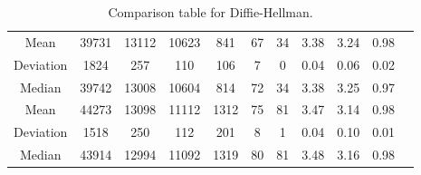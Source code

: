 \begin{table}[!ht]
{{\begin{tabular}{c|ccc|ccc|ccc|l}
                \multicolumn{1}{c|}{Mean}      & 39731                                               & 13112                                   & 10623                                  & 841     & 67       & 34       & 3.38    & 3.24     & 0.98     & \multicolumn{1}{c}{}                                                                           \\ \cline{1-10}
                \multicolumn{1}{c|}{Deviation} & 1824                                                & 257                                     & 110                                    & 106     & 7        & 0        & 0.04    & 0.06     & 0.02     & \multicolumn{1}{c}{}                                                                           \\ \cline{1-10}
                \multicolumn{1}{c|}{Median}    & 39742                                               & 13008                                   & 10604                                  & 814     & 72       & 34       & 3.38    & 3.25     & 0.97     & \multicolumn{1}{c}{\parbox[t]{1em}{}}  \\ \hline

                \multicolumn{1}{c|}{Mean}      & 44273                                               & 13098                                   & 11112                                  & 1312    & 75       & 81       & 3.47    & 3.14     & 0.98     & \multicolumn{1}{c}{}                                                                           \\ \cline{1-10}
                \multicolumn{1}{c|}{Deviation} & 1518                                                & 250                                     & 112                                    & 201     & 8        & 1        & 0.04    & 0.10     & 0.01     & \multicolumn{1}{c}{}                                                                           \\ \cline{1-10}
                \multicolumn{1}{c|}{Median}    & 43914                                               & 12994                                   & 11092                                  & 1319    & 80       & 81       & 3.48    & 3.16     & 0.98     & \multicolumn{1}{c}{\parbox[t]{1em}{}} \\
            \end{tabular}
        }
    }
    \caption{Comparison table for Diffie-Hellman.}
    \label{tab:DH}
\end{table}